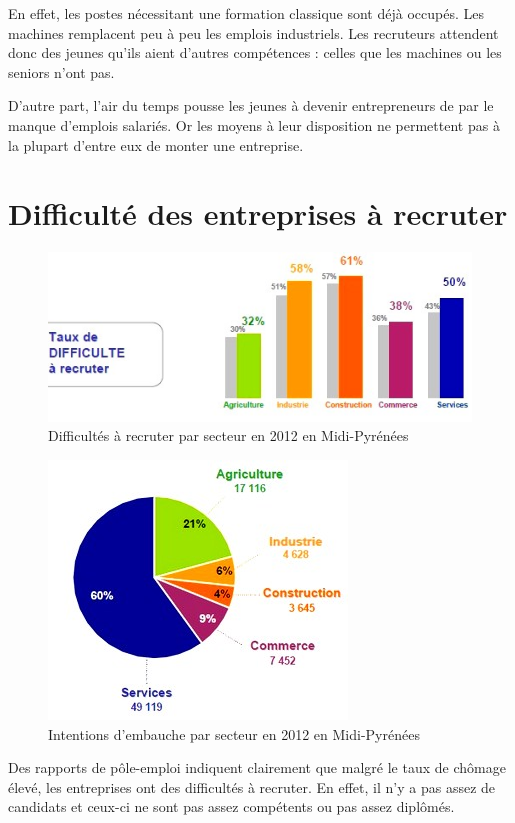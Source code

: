 En effet, les postes nécessitant une formation \og{}classique\fg{} sont déjà occupés. Les machines remplacent peu à peu les emplois industriels. Les recruteurs attendent donc des jeunes qu'ils aient d'autres compétences : celles que les machines ou les seniors n'ont pas.

D'autre part, l'air du temps pousse les jeunes à devenir entrepreneurs de par le manque d'emplois salariés. Or les moyens à leur disposition ne permettent pas à la plupart d'entre eux de monter une entreprise.


\section{Difficulté des entreprises à recruter}
\begin{figure}[p]
\centering
\includegraphics[trim=7cm 0cm 0cm 0cm, clip=true, scale=1]{../resources/illustrations/diff_recrut}
\caption{Difficultés à recruter par secteur en 2012 en Midi-Pyrénées \cite{recrutement_midi_pyr}}
\label{diff_recrut}
\end{figure}
\begin{figure}[p]
\centering
\includegraphics[scale=0.8]{../resources/illustrations/embauches}
\caption{Intentions d'embauche par secteur en 2012 en Midi-Pyrénées \cite{recrutement_midi_pyr}}
\label{embauche}
\end{figure}
Des rapports de pôle-emploi indiquent clairement que malgré le taux de chômage élevé, les entreprises ont des difficultés à recruter. En effet, il n'y a pas assez de candidats et ceux-ci ne sont pas assez compétents ou pas assez diplômés. 

